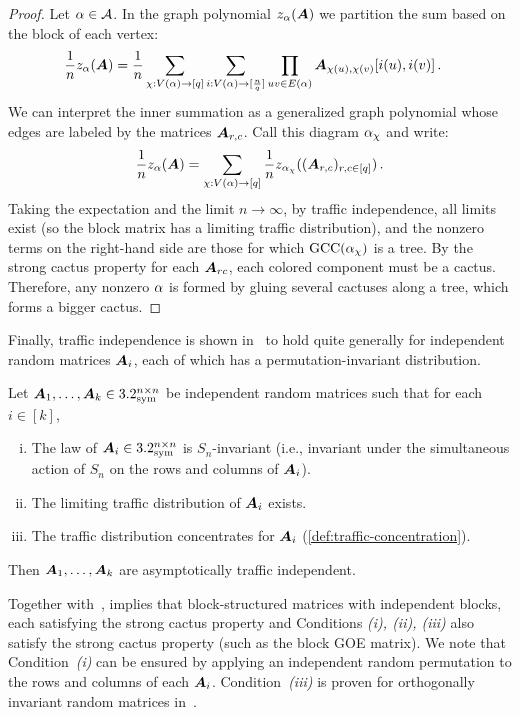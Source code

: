 \begin{proof}
    Let $\alpha \in {\cal A}$.
    In the graph polynomial $z_\alpha({\bm A})$ we partition the sum based on the block of each vertex:
    \begin{align*}
        \frac 1n z_\alpha({\bm A}) &= \frac 1n \sum_{\chi : V(\alpha) \to [q]} \sum_{\substack{i : V(\alpha) \to [\frac nq]}} \prod_{uv \in E(\alpha)} {\bm A}_{\chi(u),\chi(v)}[i(u), i(v)]\,.
    \end{align*}
    We can interpret the inner summation as a generalized graph polynomial whose edges are labeled by the matrices ${\bm A}_{r,c}$.
    Call this diagram $\alpha_\chi$ and write:
    \[
        \frac 1n z_\alpha({\bm A}) = \sum_{\chi : V(\alpha) \to [q]} \frac 1n z_{\alpha_\chi}(({\bm A}_{r,c})_{r,c\in [q]})\,.
    \]
    Taking the expectation and the limit $n\to \infty$, by traffic independence, all limits exist (so the block matrix has a limiting traffic distribution), and the nonzero terms on the right-hand side are those for which $\operatorname{GCC}(\alpha_\chi)$ is a tree.
    By the strong cactus property for each ${\bm A}_{rc}$, each colored component must be a cactus.
    Therefore, any nonzero $\alpha$ is formed by gluing several cactuses along a tree, which forms a bigger cactus.
\end{proof}

Finally, 
traffic independence is shown in~\cite{male2020traffic} to hold quite generally for independent random matrices ${\bm A}_i$, each of which has a permutation-invariant distribution.

\begin{theorem}
\label{thm:male-traffic-independence}
    Let ${\bm A}_1, \dots, {\bm A}_k \in 3.2_{\mathrm{sym}}^{n \times n}$ be independent random matrices such that for each $i\in [k]$,
    \begin{enumerate}[(i)]
        \item The law of ${\bm A}_i \in 3.2^{n \times n}_{\mathrm{sym}}$ is $S_n$-invariant (i.e., invariant under the simultaneous action of $S_{n}$ on the rows and columns of ${\bm A}_i$).
        \item The limiting traffic distribution of ${\bm A}_i$ exists.
        \item The traffic distribution concentrates for ${\bm A}_i$ (\cref{def:traffic-concentration}).
    \end{enumerate}
    Then ${\bm A}_1, \dots, {\bm A}_k$ are asymptotically traffic independent.
\end{theorem}

Together with~, 
implies that block-structured
matrices with independent blocks, each
satisfying the strong cactus property and Conditions {\em (i), (ii), (iii)} also satisfy
the strong cactus property (such as the block
GOE matrix).
We note that Condition~{\em (i)} can be ensured by applying an independent random permutation to the rows and columns of each ${\bm A}_i$.
Condition~{\em (iii)} is proven for orthogonally invariant random matrices in~.